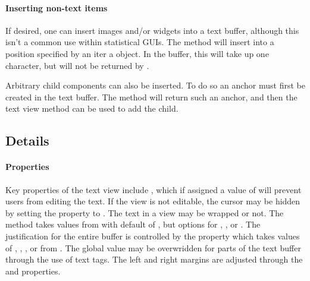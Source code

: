 
\paragraph{Inserting non-text items}
If desired, one can insert images and/or widgets into a text buffer,
although this isn't a common use within statistical GUIs. The method
 will insert into a position
specified by an iter a  object. In the buffer, this
will take up one character, but will not be returned by
. 

Arbitrary child components can also be inserted. To do so an anchor
must first be created in the text buffer. The method
 will return such an anchor, and
then the text view method  can
be used to add the child.


\subsection{ Details}
\label{sec:RGtk2:text-buffers}

\paragraph{Properties}
Key properties of the text view include , which if assigned
a value of  will prevent users from editing the text. 
If the view is not editable, the cursor may be hidden by setting the
 property to . 
The text in a view may be wrapped or not. The method 
takes values from  with default of , but
options for , , or . The
justification for the entire buffer is controlled by the
 property which takes values of ,
, , or  from .
The global value may be overwridden for parts of the text buffer
through the use of text tags. The left and right margins are adjusted
through the  and  properties. 

